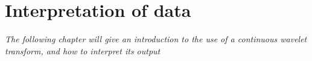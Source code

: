\chapter{Interpretation of data}
\textit{The following chapter will give an introduction to the use of a continuous wavelet transform, and how to interpret its output}